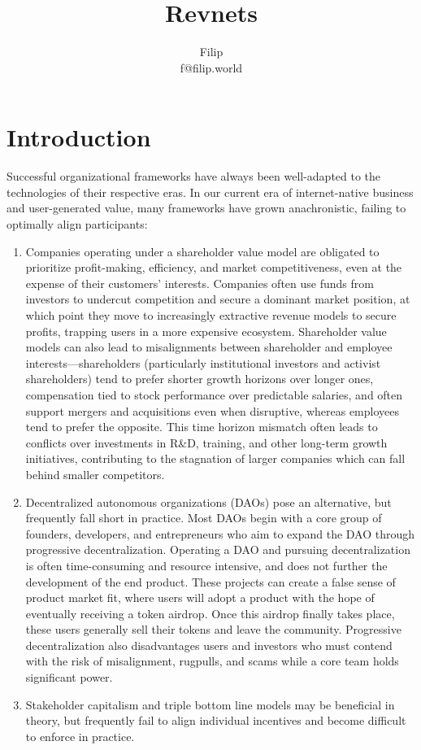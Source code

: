 \documentclass{article}
\title{Revnets}
\author{Filip\\f@filip.world}
\begin{document}
\maketitle

\section{Introduction}

Successful organizational frameworks have always been well-adapted to the technologies of their respective eras. In our current era of internet-native business and user-generated value, many frameworks have grown anachronistic, failing to optimally align participants:

\begin{enumerate}
  \item Companies operating under a shareholder value model are obligated to prioritize profit-making, efficiency, and market competitiveness, even at the expense of their customers' interests. Companies often use funds from investors to undercut competition and secure a dominant market position, at which point they move to increasingly extractive revenue models to secure profits, trapping users in a more expensive ecosystem. Shareholder value models can also lead to misalignments between shareholder and employee interests---shareholders (particularly institutional investors and activist shareholders) tend to prefer shorter growth horizons over longer ones, compensation tied to stock performance over predictable salaries, and often support mergers and acquisitions even when disruptive, whereas employees tend to prefer the opposite. This time horizon mismatch often leads to conflicts over investments in R\&D, training, and other long-term growth initiatives, contributing to the stagnation of larger companies which can fall behind smaller competitors.
  \item Decentralized autonomous organizations (DAOs) pose an alternative, but frequently fall short in practice. Most DAOs begin with a core group of founders, developers, and entrepreneurs who aim to expand the DAO through progressive decentralization. Operating a DAO and pursuing decentralization is often time-consuming and resource intensive, and does not further the development of the end product. These projects can create a false sense of product market fit, where users will adopt a product with the hope of eventually receiving a token airdrop. Once this airdrop finally takes place, these users generally sell their tokens and leave the community. Progressive decentralization also disadvantages users and investors who must contend with the risk of misalignment, rugpulls, and scams while a core team holds significant power.
  \item Stakeholder capitalism and triple bottom line models may be beneficial in theory, but frequently fail to align individual incentives and become difficult to enforce in practice.
\end{enumerate}
\end{document}
